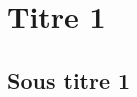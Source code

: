 \documentclass[10pt]{article}
\begin{document}



\setlength{\parskip}{0ex plus 0.2ex minus 0ex}
 \renewcommand{\contentsname}{}
 \renewcommand{\baselinestretch}{1}

\tableofcontents

 \renewcommand{\baselinestretch}{1.2}
\setlength{\parskip}{2ex plus 0.5ex minus 0.2ex}



\section{Titre 1}

\subsection{Sous titre 1}
\begin{thebibliography}{2}
\end{thebibliography}
\end{document}
